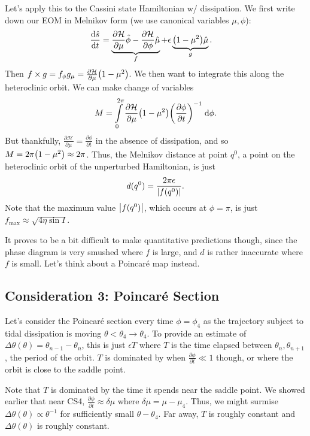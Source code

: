 \documentclass[11pt,
        usenames, %
        dvipsnames %
    ]{article}
\newcommand*{\rd}[2]{\frac{\mathrm{d}#1}{\mathrm{d}#2}}
\newcommand*{\pd}[2]{\frac{\partial#1}{\partial#2}}
\DeclarePairedDelimiter\abs{\lvert}{\rvert}
\DeclarePairedDelimiter\p{\lparen}{\rparen}
\begin{document}
Let's apply this to the Cassini state Hamiltonian w/ dissipation. We first write
down our EOM in Melnikov form (we use canonical variables $\mu, \phi$):
\begin{align}
    \rd{\hat{s}}{t}
        &= \underbrace{
            \pd{\mathcal{H}}{\mu}\hat{\phi} - \pd{\mathcal{H}}{\phi}\hat{\mu}}_f
            + \epsilon \underbrace{\p*{1 - \mu^2}\hat{\mu}}_g.
\end{align}
Then $f \times g = f_\phi g_\mu = \pd{\mathcal{H}}{\mu}\p*{1 - \mu^2}$. We then
want to integrate this along the heteroclinic orbit. We can make change of
variables
\begin{equation}
    M = \int\limits_0^{2\pi}\pd{\mathcal{H}}{\mu}
        \p*{1 - \mu^2}\p*{\pd{\phi}{t}}^{-1}\;\mathrm{d}\phi.
\end{equation}
But thankfully, $\pd{\mathcal{H}}{\mu} = \pd{\phi}{t}$ in the absence of
dissipation, and so $M = 2\pi\p*{1 - \mu^2} \approx 2\pi$.
Thus, the Melnikov distance at point $q^0$, a point on the heteroclinic
orbit of the unperturbed Hamiltonian, is just
\begin{equation}
    d(q^0) = \frac{2\pi \epsilon}{\abs*{f(q^0)}}.
\end{equation}
Note that the maximum value $\abs*{f(q^0)}$, which occurs at $\phi = \pi$, is
just $f_{\max} \approx \sqrt{4\eta \sin I}$.

It proves to be a bit difficult to make quantitative predictions though, since
the phase diagram is very smushed where $f$ is large, and $d$ is rather
inaccurate where $f$ is small. Let's think about a Poincar\'e map instead.

\subsection{Consideration 3: Poincar\'e Section}

Let's consider the Poincar\'e section every time $\phi = \phi_4$ as the
trajectory subject to tidal dissipation is moving $\theta < \theta_4 \to
\theta_4$. To provide an estimate of $\Delta \theta(\theta) = \theta_{n - 1} -
\theta_n$, this is just $\epsilon T$ where $T$ is the time elapsed between
$\theta_n, \theta_{n + 1}$, the period of the orbit. $T$ is dominated by when
$\pd{\phi}{t} \ll 1$ though, or where the orbit is close to the saddle point.

Note that $T$ is dominated by the time it spends near the saddle point. We
showed earlier that near CS4, $\pd{\phi}{t} \approx \delta \mu$ where $\delta
\mu = \mu - \mu_4$. Thus, we might surmise $\Delta \theta(\theta) \propto
\theta^{-1}$ for sufficiently small $\theta - \theta_4$. Far away, $T$ is
roughly constant and $\Delta \theta(\theta)$ is roughly constant.
\end{document}
